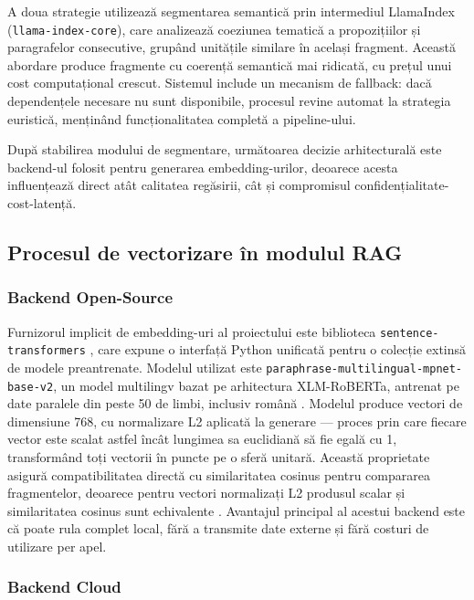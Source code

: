 \documentclass[12pt, a4paper, oneside, romanian]{teza-upb}
\begin{document}
A doua strategie utilizează segmentarea semantică prin intermediul LlamaIndex (\texttt{llama-index-core}), care analizează coeziunea tematică a propozițiilor și paragrafelor consecutive, grupând unitățile similare în același fragment. Această abordare produce fragmente cu coerență semantică mai ridicată, cu prețul unui cost computațional crescut. Sistemul include un mecanism de fallback: dacă dependențele necesare nu sunt disponibile, procesul revine automat la strategia euristică, menținând funcționalitatea completă a pipeline-ului.

După stabilirea modului de segmentare, următoarea decizie arhitecturală este backend-ul folosit pentru generarea embedding-urilor, deoarece acesta influențează direct atât calitatea regăsirii, cât și compromisul confidențialitate-cost-latență.

\subsection{Procesul de vectorizare în modulul RAG}

\subsubsection{Backend Open-Source}

Furnizorul implicit de 
embedding-uri al proiectului este biblioteca \texttt{sentence-transformers} 
\cite{sentence_transformers_doc}, care expune o interfață Python unificată pentru 
o colecție extinsă de modele preantrenate. Modelul utilizat este 
\texttt{paraphrase-multilingual-mpnet-base-v2}, un model multilingv bazat pe 
arhitectura XLM-RoBERTa, antrenat pe date paralele din peste 50 de limbi, 
inclusiv română \cite{paraphrase_multilingual_mpnet}. Modelul produce vectori de dimensiune 768, cu normalizare L2 aplicată la 
generare — proces prin care fiecare vector este scalat astfel încât lungimea 
sa euclidiană să fie egală cu 1, transformând toți vectorii în puncte pe o 
sferă unitară. Această proprietate asigură compatibilitatea directă cu 
similaritatea cosinus pentru compararea fragmentelor, deoarece pentru vectori 
normalizați L2 produsul scalar și similaritatea cosinus sunt echivalente 
\cite{paraphrase_multilingual_mpnet}. Avantajul principal al acestui backend 
este că poate rula complet local, fără a transmite date externe și fără costuri 
de utilizare per apel.

\subsubsection{Backend Cloud}
\end{document}

